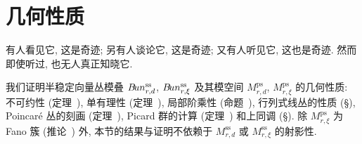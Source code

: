 \section{几何性质}\label{src:9.4}
\begin{epigraph}
有人看见它, 这是奇迹; 另有人谈论它, 这是奇迹; 又有人听见它, 这也是奇迹. 然而即使听过, 也无人真正知晓它.
\end{epigraph}
我们证明半稳定向量丛模叠 $B\!un_{r,d}^{\mathrm{ss}}$, $B\!un_{r,\xi}^{\mathrm{ss}}$ 及其模空间 $M_{r,d}^{\mathrm{ps}}$, $M_{r,\xi}^{\mathrm{ps}}$ 的几何性质: 不可约性 (定理~), 单有理性 (定理~), 局部阶乘性 (命题~), 行列式线丛的性质 (\S{}), Poincar\'e 丛的刻画 (定理~), Picard 群的计算 (定理~) 和上同调 (\S{}). 除 $M_{r,\xi}^{\mathrm{ps}}$ 为 Fano 簇 (推论~) 外, 本节的结果与证明不依赖于 $M_{r,d}^{\mathrm{ss}}$ 或 $M_{r,\xi}^{\mathrm{ss}}$ 的射影性.
